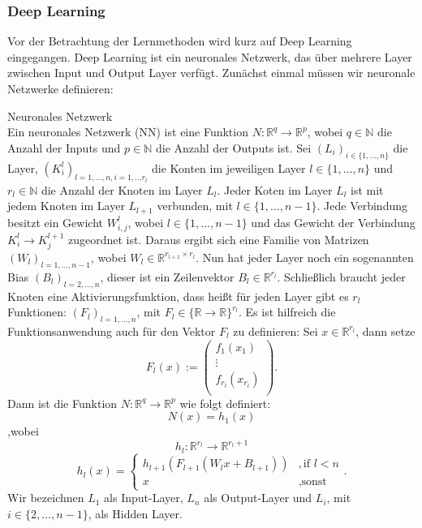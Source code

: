 \documentclass[12pt,letterpaper,ngerman]{article}
\begin{document}
\subsubsection{Deep Learning}
Vor der Betrachtung der Lernmethoden wird kurz auf Deep Learning eingegangen.
Deep Learning ist ein neuronales Netzwerk, das über mehrere Layer zwischen
Input und Output Layer verfügt.  
Zunächst einmal müssen wir neuronale Netzwerke definieren:
\begin{definition}{Neuronales Netzwerk}
  \\
  Ein neuronales Netzwerk (NN) ist eine Funktion $N: \mathbb{R}^q \to \mathbb{R}^p$,
  wobei $q\in \mathbb{N}$ die Anzahl der Inputs und $p \in \mathbb{N}$ die
  Anzahl der Outputs ist. Sei $(L_i)_{i \in \{ 1, \dots, n\}}$ die Layer,
  $(K_i^l)_{l=1,\dots, n, i = 1,\dots r_l}$ die Konten im jeweiligen Layer 
  $l \in \{1, \dots, n\}$ und $r_l \in \mathbb{N}$ die Anzahl der Knoten im
  Layer $L_l$. Jeder Koten im Layer $L_l$ ist mit jedem Knoten im 
  Layer $L_{l+1}$ verbunden, mit $l \in \{1,\dots, n-1\}$. Jede Verbindung
  besitzt ein Gewicht $W_{i,j}^l$, wobei $l \in \{1,\dots, n-1\}$ und 
  das Gewicht der Verbindung $K^l_i \to K^{l+1}_j$ zugeordnet ist.
  Daraus ergibt sich eine Familie von Matrizen 
  $(W_l)_{l=1,\dots, n-1}$, wobei 
  $ W_l\in \mathbb{R}^{r_{l+1}\times r_{l}}$.
  Nun hat jeder Layer noch ein sogenannten Bias $(B_l)_{l = 2,\dots,n}$,
  dieser ist ein Zeilenvektor $B_l \in \mathbb{R}^{r_l}$.
  Schließlich braucht jeder Knoten eine Aktivierungsfunktion, dass heißt
  für jeden Layer gibt es $r_l$ Funktionen:
  $(F_l)_{l=1,\dots,n}$, mit $F_l \in \{\mathbb{R} \to \mathbb{R}\}^{r_l}$.
  Es ist hilfreich die Funktionsanwendung auch für den Vektor $F_l$ zu definieren:
  Sei $x \in \mathbb{R}^{r_l}$, dann setze
  \[
    F_l(x) := \begin{pmatrix} 
        f_1(x_1) \\
        \vdots\\
        f_{r_l}(x_{r_l})\\
    \end{pmatrix}.
  \]
  Dann ist die Funktion $N: \mathbb{R}^q \to \mathbb{R}^p$ wie folgt definiert:
  \[
    N(x) = h_1(x)
  \]
  ,wobei
  \[h_l: \mathbb{R}^{r_l} \to \mathbb{R}^{r_l+1}\]
  \[
    h_l(x) = 
      \begin{cases}
        h_{l+1}(F_{l+1}(W_lx + B_{l+1}))& ,  \text{if } l < n  \\
        x & , \text{sonst}
      \end{cases}.
  \]
  Wir bezeichnen $L_1$ als Input-Layer, $L_n$ als Output-Layer und
  $L_i$, mit $i \in \{2, \dots, n-1\}$, als Hidden Layer.
\end{definition}
\end{document}
